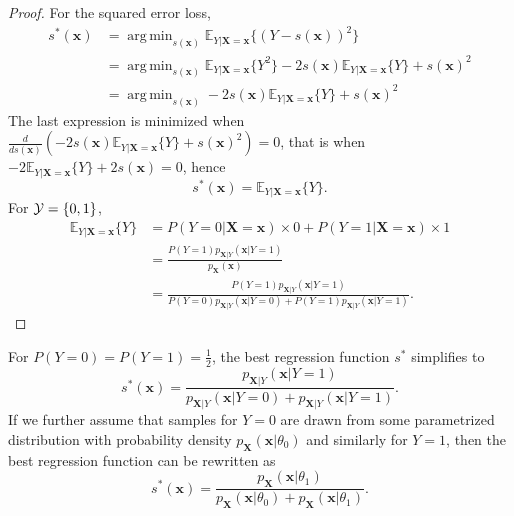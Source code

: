 \documentclass[12pt]{article}
\DeclareMathOperator*{\argmin}{arg\,min}
\numberwithin{equation}{section}
\theoremstyle{plain}
\begin{document}
\begin{proof}
For the squared error loss,
\begin{align}
s^*(\mathbf{x}) &= \argmin_{s(\mathbf{x})} \mathbb{E}_{Y|\mathbf{X}=\mathbf{x}} \{ (Y - s(\mathbf{x}))^2 \} \nonumber \\
&=  \argmin_{s(\mathbf{x})} \mathbb{E}_{Y|\mathbf{X}=\mathbf{x}} \{ Y^2 \} - 2s(\mathbf{x}) \mathbb{E}_{Y|\mathbf{X}=\mathbf{x}} \{ Y \} + s(\mathbf{x})^2 \nonumber \\
&=  \argmin_{s(\mathbf{x})} -2s(\mathbf{x}) \mathbb{E}_{Y|\mathbf{X}=\mathbf{x}} \{ Y \} + s(\mathbf{x})^2
\end{align}
The last expression is minimized when $\frac{d}{ds(\mathbf{x})} (-2s(\mathbf{x}) \mathbb{E}_{Y|\mathbf{X}=\mathbf{x}} \{ Y \} + s(\mathbf{x})^2) = 0$,
that is when $-2 \mathbb{E}_{Y|\mathbf{X}=\mathbf{x}} \{ Y \} + 2 s(\mathbf{x}) = 0$, hence
\begin{equation}
s^*(\mathbf{x}) = \mathbb{E}_{Y|\mathbf{X}=\mathbf{x}} \{ Y \}.
\end{equation}
For ${\cal Y} = \{ 0, 1 \}$,
\begin{align}
\mathbb{E}_{Y|\mathbf{X}=\mathbf{x}} \{ Y \} &= P(Y=0|\mathbf{X}=\mathbf{x}) \times 0 +  P(Y=1|\mathbf{X}=\mathbf{x}) \times 1 \nonumber \\
&= \frac{P(Y=1) p_{\mathbf{X}|Y}(\mathbf{x}|Y=1)}{p_{\mathbf{X}}(\mathbf{x})} \nonumber \\
&= \frac{P(Y=1) p_{\mathbf{X}|Y}(\mathbf{x}|Y=1)}{P(Y=0) p_{\mathbf{X}|Y}(\mathbf{x} | Y=0) + P(Y=1) p_{\mathbf{X}|Y}(\mathbf{x} | Y=1)}.
\end{align}
\end{proof}

For $P(Y=0)=P(Y=1)=\frac{1}{2}$, the best regression function $s^*$ simplifies
to
\begin{equation}
s^*(\mathbf{x}) = \frac{p_{\mathbf{X}|Y}(\mathbf{x}|Y=1)}{p_{\mathbf{X}|Y}(\mathbf{x} | Y=0) + p_{\mathbf{X}|Y}(\mathbf{x} | Y=1)}.
\end{equation}
If we further assume that samples for $Y=0$ are drawn from some parametrized
distribution with probability density $p_{\mathbf{X}}(\mathbf{x}|\theta_0)$
and similarly for $Y=1$, then the best regression function can be rewritten
as
\begin{equation}
s^*(\mathbf{x}) = \frac{p_{\mathbf{X}}(\mathbf{x}|\theta_1)}{p_{\mathbf{X}}(\mathbf{x} | \theta_0) + p_{\mathbf{X}}(\mathbf{x} | \theta_1)}.
\end{equation}
\end{document}
